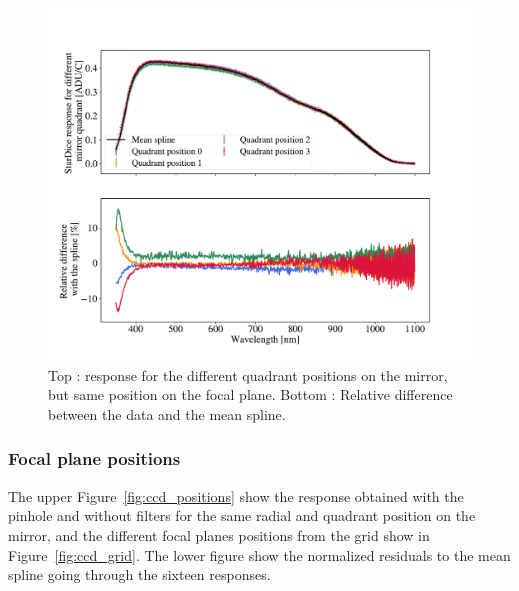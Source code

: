 \begin{figure}[h]
    \centering
    \includegraphics[width=\columnwidth]{fig/quadrant_positions.pdf}
    \caption{Top : \SD response for the different quadrant positions on the mirror, but same position on the focal plane. Bottom : Relative difference between the data and the mean spline.}
    \label{fig:quadrant_positions}
\end{figure}

\subsubsection{Focal plane positions}

The upper Figure~\ref{fig:ccd_positions} show the \SD response obtained with the \spinhole pinhole and without filters for the same radial and quadrant position on the mirror, and the different focal planes positions from the grid show in Figure~\ref{fig:ccd_grid}. The lower figure show the normalized residuals to the mean spline going through the sixteen responses.

